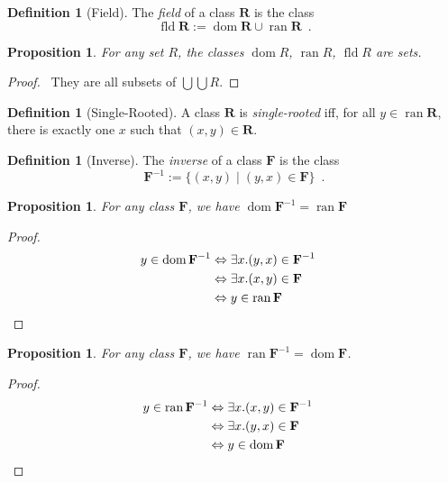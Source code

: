 \documentclass{book}
\let\qed\relax
\newtheorem{prop}[ax]{Proposition}
\theoremstyle{definition}
\newtheorem{df}[ax]{Definition}
\newcommand{\dom}{\ensuremath{\operatorname{dom}}}
\newcommand{\ran}{\ensuremath{\operatorname{ran}}}
\newcommand{\fld}{\ensuremath{\operatorname{fld}}}
\begin{document}
\begin{df}[Field]
The \emph{field} of a class $\mathbf{R}$ is the class
\[ \fld \mathbf{R} := \dom \mathbf{R} \cup \ran \mathbf{R} \enspace . \]
\end{df}

\begin{prop}
For any set $R$, the classes $\dom R$, $\ran R$, $\fld R$ are sets.
\end{prop}

\begin{proof}
\pf\ They are all subsets of $\bigcup \bigcup R$. \qed
\end{proof}

\begin{df}[Single-Rooted]
A class $\mathbf{R}$ is \emph{single-rooted} iff, for all $y \in \ran \mathbf{R}$, there is exactly one $x$ such that $(x,y) \in \mathbf{R}$.
\end{df}

\begin{df}[Inverse]
The \emph{inverse} of a class $\mathbf{F}$ is the class
\[ \mathbf{F}^{-1} := \{ (x,y) \mid (y,x) \in \mathbf{F} \} \enspace . \]
\end{df}

\begin{prop}
\label{prop:dominv}
For any class $\mathbf{F}$, we have $\dom \mathbf{F}^{-1} = \ran \mathbf{F}$
\end{prop}

\begin{proof}
\pf
\begin{align*}
y \in \dom \mathbf{F}^{-1} & \Leftrightarrow \exists x. (y,x) \in \mathbf{F}^{-1} \\
& \Leftrightarrow \exists x. (x,y) \in \mathbf{F} \\
& \Leftrightarrow y \in \ran \mathbf{F} & \qed
\end{align*}
\end{proof}

\begin{prop}
For any class $\mathbf{F}$, we have $\ran \mathbf{F}^{-1} = \dom \mathbf{F}$.
\end{prop}

\begin{proof}
\pf
\begin{align*}
y \in \ran \mathbf{F}^{-1} & \Leftrightarrow \exists x. (x,y) \in \mathbf{F}^{-1} \\
& \Leftrightarrow \exists x. (y,x) \in \mathbf{F} \\
& \Leftrightarrow y \in \dom \mathbf{F} & \qed
\end{align*}
\end{proof}
\end{document}
